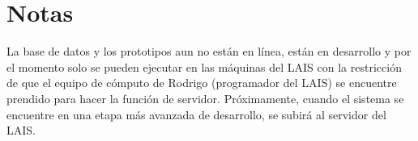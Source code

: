 \documentclass[10pt,letterpaper]{article}
\begin{document}
\section{Notas}
La base de datos y los prototipos aun no están en línea, están en desarrollo y por el momento solo se pueden ejecutar en las máquinas del LAIS con la restricción de que el equipo de cómputo de Rodrigo (programador del LAIS) se encuentre prendido para hacer la función de servidor. Próximamente, cuando el sistema se encuentre en una etapa más avanzada de desarrollo, se subirá al servidor del LAIS.
\end{document}
